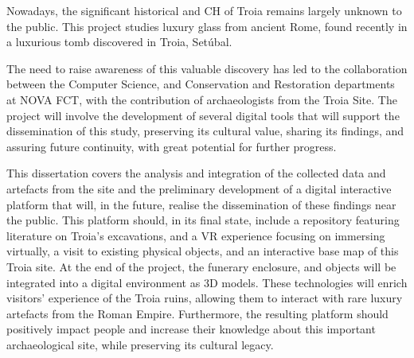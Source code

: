 
Nowadays, the significant historical and \gls{CH} of Troia remains largely unknown to the public. This project studies luxury glass from ancient Rome, found recently in a luxurious tomb discovered in Troia, Setúbal.  

The need to raise awareness of this valuable discovery has led to the collaboration between the Computer Science, and Conservation and Restoration departments at NOVA FCT, with the contribution of archaeologists from the Troia Site. The project will involve the development of several digital tools that will support the dissemination of this study, preserving its cultural value, sharing its findings, and assuring future continuity, with great potential for further progress.  

This dissertation covers the analysis and integration of the collected data and artefacts from the site and the preliminary development of a digital interactive platform that will, in the future, realise the dissemination of these findings near the public. This platform should, in its final state, include a repository featuring literature on Troia’s excavations, and a \gls{VR} experience focusing on immersing virtually, a visit to existing physical objects, and an interactive base map of this Troia site. At the end of the project, the funerary enclosure, and objects will be integrated into a digital environment as \gls{3D} models. These technologies will enrich visitors' experience of the Troia ruins, allowing them to interact with rare luxury artefacts from the Roman Empire. Furthermore, the resulting platform should positively impact people and increase their knowledge about this important archaeological site, while preserving its cultural legacy. 



